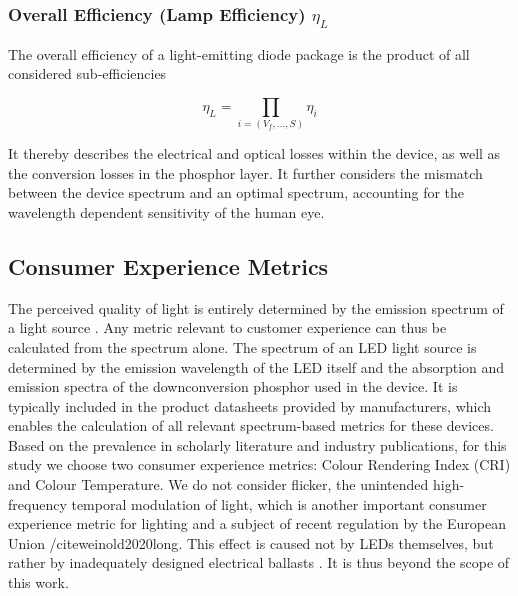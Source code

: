 \documentclass[twoside,twocolumn,9pt]{article}
\begin{document}
\subsubsection{Overall Efficiency (Lamp Efficiency) $\eta_L$}

The overall efficiency of a light-emitting diode package is the product of all considered sub-efficiencies

\begin{equation}
    \eta_L = \prod_{i=(V_f, \dots, S)} \eta_i
\end{equation}

It thereby describes the electrical and optical losses within the device, as well as the conversion losses in the phosphor layer. It further considers the mismatch between the device spectrum and an optimal spectrum, accounting for the wavelength dependent sensitivity of the human eye.

\subsection{Consumer Experience Metrics}

The perceived quality of light is entirely determined by the emission spectrum of a light source \cite{ies_handbook}. Any metric relevant to customer experience can thus be calculated from the spectrum alone. The spectrum of an LED light source is determined by the emission wavelength of the LED itself and the absorption and emission spectra  of the downconversion phosphor used in the device. It is typically included in the product datasheets provided by manufacturers, which enables the calculation of all relevant spectrum-based metrics for these devices. Based on the prevalence in scholarly literature and industry publications, for this study we choose two consumer experience metrics: Colour Rendering Index (CRI) and Colour Temperature. We do not consider flicker, the unintended high-frequency temporal modulation of light, which is another important consumer experience metric for lighting and a subject of recent regulation by the European Union /cite{weinold2020long}. This effect is caused not by LEDs themselves, but rather by inadequately designed electrical ballasts \cite{Lehman2014}. It is thus beyond the scope of this work. 
\end{document}
